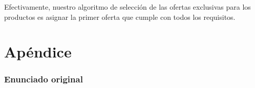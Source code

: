 \documentclass[a4paper,11pt]{article}
\begin{document}
Efectivamente, nuestro algoritmo de selección de las ofertas exclusivas para
los productos es asignar la primer oferta que cumple con todos los requisitos.

\clearpage

\part{Apéndice}
\appendix

\section{Enunciado original}\label{sec:enunciado}

\end{document}
